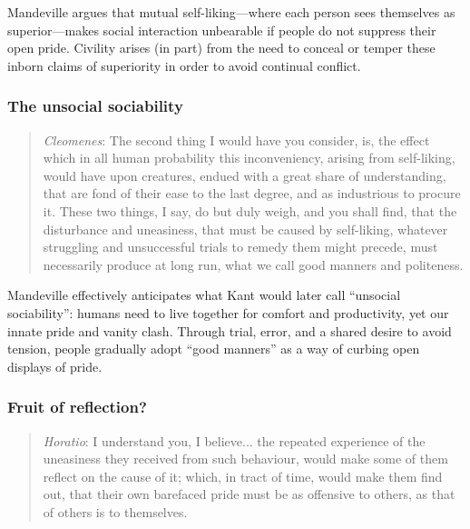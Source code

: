             Mandeville argues that mutual self-liking—where each person sees themselves as superior—makes social interaction unbearable if people do not suppress their open pride. Civility arises (in part) from the need to conceal or temper these inborn claims of superiority in order to avoid continual conflict.

        \subsubsection{The unsocial sociability}

            \begin{quote}
                \textit{Cleomenes}: The second thing I would have you consider, is, the effect which in all human probability this inconveniency, arising from self-liking, would have upon creatures, endued with a great share of understanding, that are fond of their ease to the last degree, and as industrious to procure it. These two things, I say, do but duly weigh, and you shall find, that the disturbance and uneasiness, that must be caused by self-liking, whatever struggling and unsuccessful trials to remedy them might precede, must necessarily produce at long run, what we call good manners and politeness.
            \end{quote}

            \begin{remark}
                Mandeville effectively anticipates what Kant would later call “unsocial sociability”: humans need to live together for comfort and productivity, yet our innate pride and vanity clash. 
                Through trial, error, and a shared desire to avoid tension, people gradually adopt “good manners” as a way of curbing open displays of pride.
            \end{remark}

        \subsubsection{Fruit of reflection?}

            \begin{quote}
                \textit{Horatio}: I understand you, I believe... the repeated experience of the uneasiness they received from such behaviour, would make some of them reflect on the cause of it; which, in tract of time, would make them find out, that their own barefaced pride must be as offensive to others, as that of others is to themselves.
            \end{quote}

